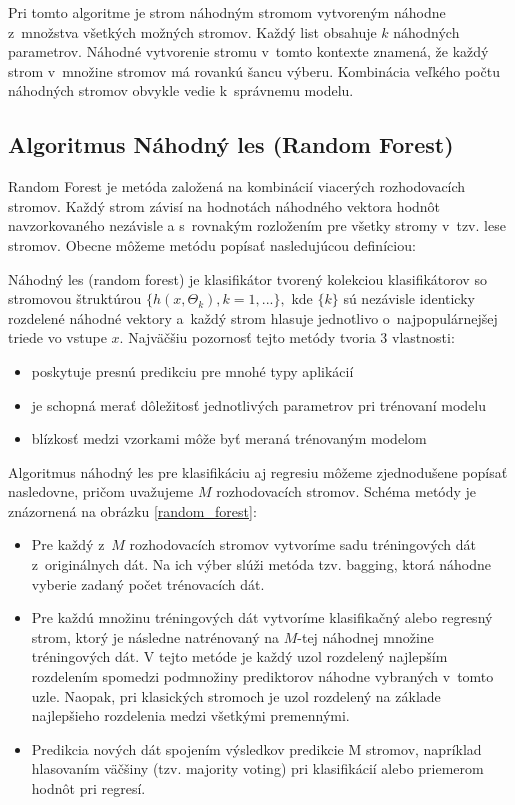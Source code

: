 Pri tomto algoritme je strom náhodným stromom vytvoreným náhodne z~množstva všetkých možných stromov. Každý list obsahuje $k$ náhodných parametrov. Náhodné vytvorenie stromu v~tomto kontexte znamená, že každý strom v~množine stromov má rovankú šancu výberu. Kombinácia veľkého počtu náhodných stromov obvykle vedie k~správnemu modelu. 

\subsection{Algoritmus Náhodný les (Random Forest)}

Random Forest \cite{breiman} je metóda založená na kombinácií viacerých rozhodovacích stromov. Každý strom závisí na hodnotách náhodného vektora hodnôt navzorkovaného nezávisle a s~rovnakým rozložením pre všetky stromy v~tzv. lese stromov. Obecne môžeme metódu popísať nasledujúcou definíciou:

Náhodný les (random forest) je klasifikátor tvorený kolekciou klasifikátorov so stromovou štruktúrou $\{h(x,\Theta_{k}), k=1, ...\}, $ kde $\{k\}$ sú nezávisle identicky rozdelené náhodné vektory a~každý strom hlasuje jednotlivo o~najpopulárnejšej triede vo vstupe $x$.
\newpage
Najväčšiu pozornosť tejto metódy tvoria 3 vlastnosti:
\begin{itemize}
	\item poskytuje presnú predikciu pre mnohé typy aplikácií
	\item je schopná merať dôležitosť jednotlivých parametrov pri trénovaní modelu
	\item blízkosť medzi vzorkami môže byť meraná trénovaným modelom
\end{itemize} 

Algoritmus náhodný les pre klasifikáciu aj regresiu môžeme zjednodušene popísať nasledovne, pričom uvažujeme $M$ rozhodovacích stromov. Schéma metódy je znázornená na obrázku \ref{random_forest}:
\begin{itemize}
	\item Pre každý z~$M$ rozhodovacích stromov vytvoríme sadu tréningových dát z~originálnych dát. Na ich výber slúži metóda tzv. bagging, ktorá náhodne vyberie zadaný počet trénovacích dát.
	\item Pre každú množinu tréningových dát vytvoríme klasifikačný alebo regresný strom, ktorý je následne natrénovaný na $M$-tej náhodnej množine tréningových dát. V tejto metóde je každý uzol rozdelený najlepším rozdelením spomedzi podmnožiny prediktorov náhodne vybraných v~tomto uzle. Naopak, pri klasických stromoch je uzol rozdelený na základe najlepšieho rozdelenia medzi všetkými premennými.
	\item Predikcia nových dát spojením výsledkov predikcie M stromov, napríklad hlasovaním väčšiny (tzv. majority voting) pri klasifikácií alebo priemerom hodnôt pri regresí.
\end{itemize}

